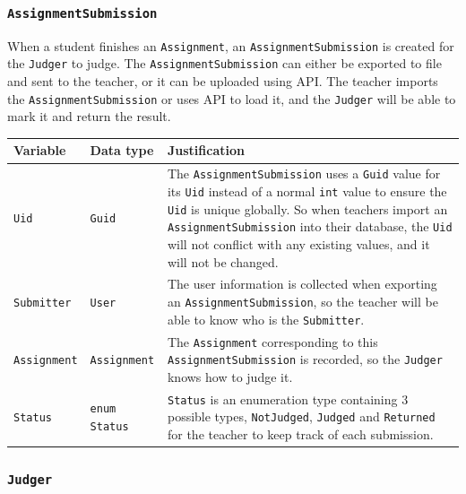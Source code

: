 \documentclass[a4paper]{report}
\begin{document}
\subsubsection{\texttt{AssignmentSubmission}}

When a student finishes an \texttt{Assignment}, an \texttt{AssignmentSubmission} is created for the \texttt{Judger} to judge. The \texttt{AssignmentSubmission} can either be exported to file and sent to the teacher, or it can be uploaded using API. The teacher imports the \texttt{AssignmentSubmission} or uses API to load it, and the \texttt{Judger} will be able to mark it and return the result.

\begin{tabulary}{\textwidth}{|l|l|L|}
    \hline
    Variable & Data type & Justification \\
    \hline
    \texttt{Uid} & \texttt{Guid} & The \texttt{AssignmentSubmission} uses a \texttt{Guid} value for its \texttt{Uid} instead of a normal \texttt{int} value to ensure the \texttt{Uid} is unique globally. So when teachers import an \texttt{AssignmentSubmission} into their database, the \texttt{Uid} will not conflict with any existing values, and it will not be changed. \\
    \hline
    \texttt{Submitter} & \texttt{User} & The user information is collected when exporting an \texttt{AssignmentSubmission}, so the teacher will be able to know who is the \texttt{Submitter}. \\
    \hline
    \texttt{Assignment} & \texttt{Assignment} & The \texttt{Assignment} corresponding to this \texttt{AssignmentSubmission} is recorded, so the \texttt{Judger} knows how to judge it. \\
    \hline
    \texttt{Status} & \texttt{enum Status} & \texttt{Status} is an enumeration type containing 3 possible types, \texttt{NotJudged}, \texttt{Judged} and \texttt{Returned} for the teacher to keep track of each submission. \\
    \hline
\end{tabulary}

\subsubsection{\texttt{Judger}}
\end{document}
